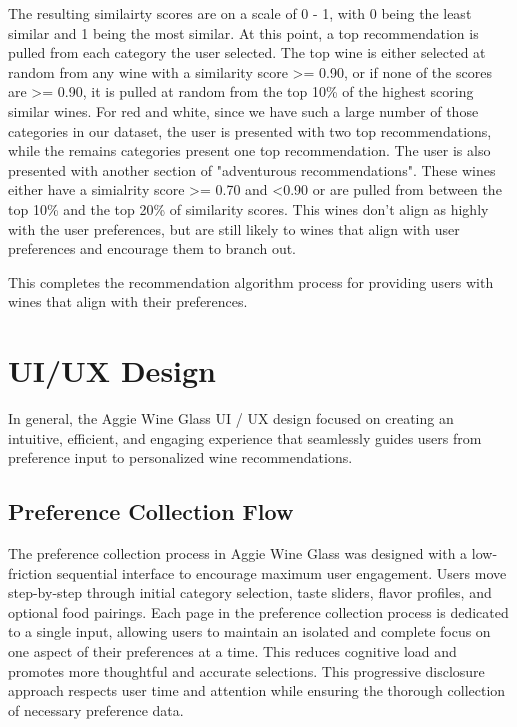 \documentclass{article} %
\begin{document}
The resulting similairty scores are on a scale of 0 - 1, with 0 being the least similar and 1 being the most similar. At this point, a top recommendation is pulled from each category the user selected. The top wine is either selected at random from any wine with a similarity score >= 0.90, or if none of the scores are >= 0.90, it is pulled at random from the top 10\% of the highest scoring similar wines. For red and white, since we have such a large number of those categories in our dataset, the user is presented with two top recommendations, while the remains categories present one top recommendation. The user is also presented with another section of "adventurous recommendations". These wines either have a simialrity score >= 0.70 and <0.90 or are pulled from between the top 10\% and the top 20\% of similarity scores. This wines don't align as highly with the user preferences, but are still likely to wines that align with user preferences and encourage them to branch out. 

This completes the recommendation algorithm process for providing users with wines that align with their preferences.

\section{UI/UX Design}

In general, the Aggie Wine Glass UI / UX design focused on creating an intuitive, efficient, and engaging experience that seamlessly guides users from preference input to personalized wine recommendations.

\subsection{Preference Collection Flow}

The preference collection process in Aggie Wine Glass was designed with a low-friction sequential interface to encourage maximum user engagement. Users move step-by-step through initial category selection, taste sliders, flavor profiles, and optional food pairings. Each page in the preference collection process is dedicated to a single input, allowing users to maintain an isolated and complete focus on one aspect of their preferences at a time. This reduces cognitive load and promotes more thoughtful and accurate selections. This progressive disclosure approach respects user time and attention while ensuring the thorough collection of necessary preference data.
\end{document}
